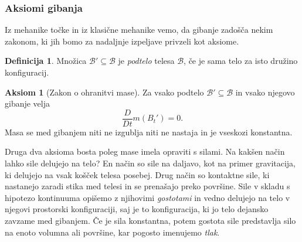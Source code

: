 \documentclass[12pt,a4paper,twoside]{article}
\theoremstyle{definition} %
\newtheorem{definicija}{Definicija}[section]
\newtheorem{aksiom}{Aksiom}
\theoremstyle{plain} %
\numberwithin{equation}{section}
\newcommand{\B}{\mathcal{B}}
\newcommand{\DD}[2]{\ensuremath{\frac{D #1}{D #2}}}
\newcommand{\DDt}[1]{\DD{#1}{t}}
\begin{document}
\subsubsection{Aksiomi gibanja}
Iz mehanike točke in iz klasične mehanike vemo, da gibanje zadošča nekim
zakonom, ki jih bomo za nadaljnje izpeljave privzeli kot aksiome.

\begin{definicija}
  Množica $\B' \subseteq \B$ je \emph{podtelo} telesa $\B$, če je sama telo za isto družino
  konfiguracij.
\end{definicija}

\begin{aksiom}[Zakon o ohranitvi mase]
  \label{aks:masa}
  Za vsako podtelo $\B' \subseteq  \B$ in vsako njegovo gibanje velja
  \begin{equation}
  \DDt{}m(B_t') = 0.
    \label{eq:masa}
  \end{equation}
  Masa se med gibanjem niti ne izgublja niti ne nastaja in je vseskozi konstantna.
\end{aksiom}

Druga dva aksioma bosta poleg mase imela opraviti s silami. Na kakšen način lahko sile delujejo na
telo? En način so sile na daljavo, kot na primer gravitacija, ki delujejo na vsak košček telesa
posebej. Drug način so kontaktne sile, ki nastanejo zaradi stika med telesi in se prenašajo preko
površine. Sile v skladu s hipotezo kontinuuma opišemo z njihovimi \emph{gostotami} in vedno
delujejo na telo v njegovi prostorski konfiguraciji, saj je to konfiguracija, ki jo telo dejansko
zavzame med gibanjem. Če je sila konstantna, potem gostota sile predstavlja silo na enoto volumna
ali površine, kar pogosto imenujemo \emph{tlak}.
\end{document}
